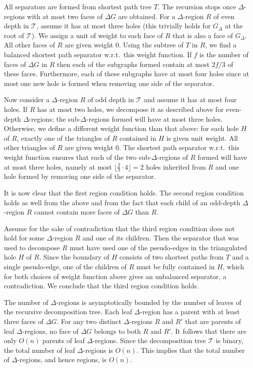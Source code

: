 \documentclass[11pt]{article}
\begin{document}
All separators are formed from shortest path tree $T$. The recursion stops once $\Delta$-regions with at most two faces of $\Delta G$ are obtained. For a $\Delta$-region $R$ of even depth in $\mathcal T$, assume it has at most three holes (this trivially holds for $G_\Delta$ at the root of $\mathcal T$). We assign a unit of weight to each face of $R$ that is also a face of $G_\Delta$. All other faces of $R$ are given weight $0$. Using the subtree of $T$ in $R$, we find a balanced shortest path separator w.r.t.~this weight function. If $f$ is the number of faces of $\Delta G$ in $R$ then each of the subgraphs formed contain at most $2f/3$ of these faces. Furthermore, each of these subgraphs have at most four holes since at most one new hole is formed when removing one side of the separator.

Now consider a $\Delta$-region $R$ of odd depth in $\mathcal T$ and assume it has at most four holes. If $R$ has at most two holes, we decompose it as described above for even-depth $\Delta$-regions; the sub-$\Delta$-regions formed will have at most three holes. Otherwise, we define a different weight function than that above: for each hole $H$ of $R$, exactly one of the triangles of $R$ contained in $H$ is given unit weight. All other triangles of $R$ are given weight $0$. The shortest path separator w.r.t.~this weight function ensures that each of the two sub-$\Delta$-regions of $R$ formed will have at most three holes, namely at most $\lfloor\frac 2 3\cdot 4\rfloor = 2$ holes inherited from $R$ and one hole formed by removing one side of the separator.

It is now clear that the first region condition holds. The second region condition holds as well from the above and from the fact that each child of an odd-depth $\Delta$-region $R$ cannot contain more faces of $\Delta G$ than $R$.

Assume for the sake of contradiction that the third region condition does not hold for some $\Delta$-region $R$ and one of its children. Then the separator that was used to decompose $R$ must have used one of the pseudo-edges in the triangulated hole $H$ of $R$. Since the boundary of $H$ consists of two shortest paths from $T$ and a single pseudo-edge, one of the children of $R$ must be fully contained in $H$, which for both choices of weight function above gives an unbalanced separator, a contradiction. We conclude that the third region condition holds.

The number of $\Delta$-regions is asymptotically bounded by the number of leaves of the recursive decomposition tree. Each leaf $\Delta$-region has a parent with at least three faces of $\Delta G$. For any two distinct $\Delta$-regions $R$ and $R'$ that are parents of leaf $\Delta$-regions, no face of $\Delta G$ belongs to both $R$ and $R'$. It follows that there are only $O(n)$ parents of leaf $\Delta$-regions. Since the decomposition tree $\mathcal T$ is binary, the total number of leaf $\Delta$-regions is $O(n)$. This implies that the total number of $\Delta$-regions, and hence regions, is $O(n)$.
\end{document}
